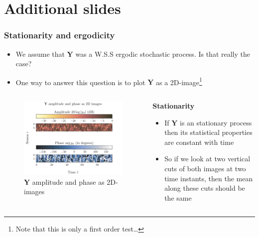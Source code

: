 \documentclass[UKenglish,8pt,aspectratio=1610]{beamer}
\begin{document}
\section{Additional slides}
\begin{frame}
	\frametitle{Stationarity and ergodicity}
\begin{itemize}
	\item We assume that $\mathbf{Y}$ was a W.S.S ergodic stochastic process. Is that really the case?
	\item One way to answer this question is to plot $\mathbf{Y}$ as a 2D-image\footnote{Note that this is only a first order test\dots}
\end{itemize}

\begin{columns}
\begin{column}{0.5\textwidth}
	\begin{figure}[h!]
		\vspace{-15pt}
		\centering
		\includegraphics[scale=0.5]{question1/part_A_question_1_WSS_ergodicity.pdf}
		\caption{$\mathbf{Y}$ amplitude and phase as 2D-images}
	\end{figure}
\end{column}
\begin{column}{0.5\textwidth}
\textbf{Stationarity}
\begin{itemize}
	\item If $\mathbf{Y}$ is an stationary process then its statistical properties are constant with time
	\item So if we look at two vertical cuts of both images at two time instants, then the mean along these cuts should be the same

\end{itemize}
\end{column}
\end{columns}
\end{frame}
\end{document}
